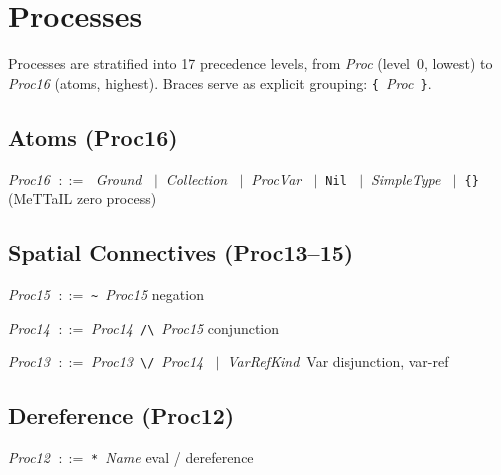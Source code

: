 \documentclass[11pt,a4paper]{article}
\newcommand{\kw}[1]{\texttt{\textcolor{kw}{#1}}}       %
\newcommand{\sym}[1]{\texttt{#1}}                       %
\newcommand{\nt}[1]{\textit{\textcolor{nt}{#1}}}        %
\newcommand{\tok}[1]{\textsf{#1}}                       %
\newcommand{\OR}{\ensuremath{\;\mid\;}}                  %
\newcommand{\bnfdef}{\ensuremath{\;::=\;}}               %
\newenvironment{grammar}{%
  \par\smallskip\begin{list}{}{%
    \setlength{\leftmargin}{1.5em}%
    \setlength{\itemsep}{2pt}%
    \setlength{\parsep}{0pt}}%
}{\end{list}\smallskip}
\begin{document}
\section{Processes}
\label{sec:proc}

Processes are stratified into 17 precedence levels, from \nt{Proc}
(level~0, lowest) to \nt{Proc16} (atoms, highest).  Braces serve as
explicit grouping: \sym{\{}~\nt{Proc}~\sym{\}}.

\subsection{Atoms (Proc16)}

\begin{grammar}
\item \nt{Proc16} \bnfdef
    \nt{Ground}
    \OR \nt{Collection}
    \OR \nt{ProcVar}
    \OR \kw{Nil}
    \OR \nt{SimpleType}
    \OR \sym{\{}\sym{\}} \quad\textcolor{cmt}{(MeTTaIL zero process)}
\end{grammar}

\subsection{Spatial Connectives (Proc13--15)}

\begin{grammar}
\item \nt{Proc15} \bnfdef \sym{\~{}}~\nt{Proc15}
    \hfill\textcolor{cmt}{negation}
\item \nt{Proc14} \bnfdef \nt{Proc14}~\sym{/\textbackslash}~\nt{Proc15}
    \hfill\textcolor{cmt}{conjunction}
\item \nt{Proc13} \bnfdef \nt{Proc13}~\sym{\textbackslash/}~\nt{Proc14}
    \OR \nt{VarRefKind}~\tok{Var}
    \hfill\textcolor{cmt}{disjunction, var-ref}
\end{grammar}

\subsection{Dereference (Proc12)}

\begin{grammar}
\item \nt{Proc12} \bnfdef \sym{*}~\nt{Name}
    \hfill\textcolor{cmt}{eval / dereference}
\end{grammar}
\end{document}
